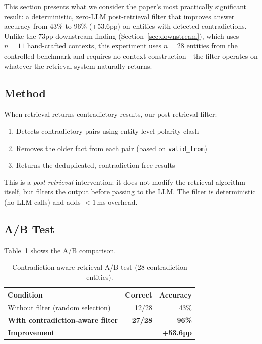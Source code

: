 \documentclass{article}
\begin{document}
This section presents what we consider the paper's most practically significant result: a deterministic, zero-LLM post-retrieval filter that improves answer accuracy from 43\% to 96\% (+53.6pp) on entities with detected contradictions. Unlike the 73pp downstream finding (Section~\ref{sec:downstream}), which uses $n{=}11$ hand-crafted contexts, this experiment uses $n{=}28$ entities from the controlled benchmark and requires no context construction---the filter operates on whatever the retrieval system naturally returns.

\subsection{Method}

When retrieval returns contradictory results, our post-retrieval filter:
\begin{enumerate}
\item Detects contradictory pairs using entity-level polarity clash
\item Removes the older fact from each pair (based on \texttt{valid\_from})
\item Returns the deduplicated, contradiction-free results
\end{enumerate}

This is a \emph{post-retrieval} intervention: it does not modify the retrieval algorithm itself, but filters the output before passing to the LLM. The filter is deterministic (no LLM calls) and adds $<1$\,ms overhead.

\subsection{A/B Test}

Table~\ref{tab:ab} shows the A/B comparison.



\begin{table}[h]
\centering
\caption{Contradiction-aware retrieval A/B test (28 contradiction entities).}
\begin{tabular}{lrr}
\toprule
Condition & Correct & Accuracy \\
\midrule
Without filter (random selection) & 12/28 & 43\% \\
\textbf{With contradiction-aware filter} & \textbf{27/28} & \textbf{96\%} \\
\midrule
\textbf{Improvement} & & \textbf{+53.6pp} \\
\bottomrule
\end{tabular}
\label{tab:ab}
\end{table}
\end{document}
